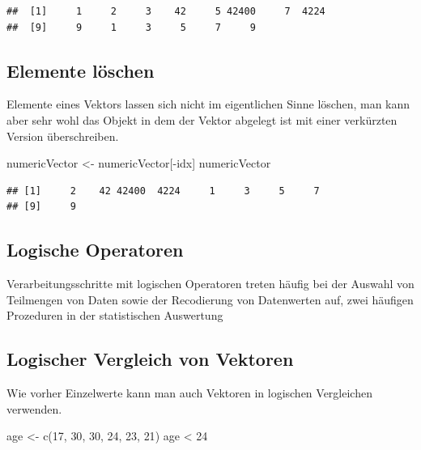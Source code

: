 \documentclass[
]{book}
\newenvironment{Shaded}{\begin{snugshade}}{\end{snugshade}}
\newcommand{\DecValTok}[1]{\textcolor[rgb]{0.00,0.00,0.81}{#1}}
\newcommand{\FunctionTok}[1]{\textcolor[rgb]{0.00,0.00,0.00}{#1}}
\newcommand{\NormalTok}[1]{#1}
\newcommand{\OtherTok}[1]{\textcolor[rgb]{0.56,0.35,0.01}{#1}}
\newcommand{\SpecialCharTok}[1]{\textcolor[rgb]{0.00,0.00,0.00}{#1}}
\begin{document}
\begin{verbatim}
##  [1]     1     2     3    42     5 42400     7  4224
##  [9]     9     1     3     5     7     9
\end{verbatim}

\hypertarget{elemente-luxf6schen}{%
\subsection{Elemente löschen}\label{elemente-luxf6schen}}

Elemente eines Vektors lassen sich nicht im eigentlichen Sinne löschen, man kann aber sehr wohl das Objekt in dem der Vektor abgelegt ist mit einer verkürzten Version überschreiben.

\begin{Shaded}
\begin{Highlighting}[]
\NormalTok{numericVector }\OtherTok{\textless{}{-}}\NormalTok{ numericVector[}\SpecialCharTok{{-}}\NormalTok{idx]}
\NormalTok{numericVector}
\end{Highlighting}
\end{Shaded}

\begin{verbatim}
## [1]     2    42 42400  4224     1     3     5     7
## [9]     9
\end{verbatim}

\hypertarget{logische-operatoren}{%
\subsection{Logische Operatoren}\label{logische-operatoren}}

Verarbeitungsschritte mit logischen Operatoren treten häufig bei der Auswahl von Teilmengen von Daten
sowie der Recodierung von Datenwerten auf, zwei häufigen Prozeduren in der statistischen Auswertung

\hypertarget{logischer-vergleich-von-vektoren}{%
\subsection{Logischer Vergleich von Vektoren}\label{logischer-vergleich-von-vektoren}}

Wie vorher Einzelwerte kann man auch Vektoren in logischen Vergleichen verwenden.

\begin{Shaded}
\begin{Highlighting}[]
\NormalTok{age }\OtherTok{\textless{}{-}} \FunctionTok{c}\NormalTok{(}\DecValTok{17}\NormalTok{, }\DecValTok{30}\NormalTok{, }\DecValTok{30}\NormalTok{, }\DecValTok{24}\NormalTok{, }\DecValTok{23}\NormalTok{, }\DecValTok{21}\NormalTok{)}
\NormalTok{age }\SpecialCharTok{\textless{}} \DecValTok{24}
\end{Highlighting}
\end{Shaded}
\end{document}
